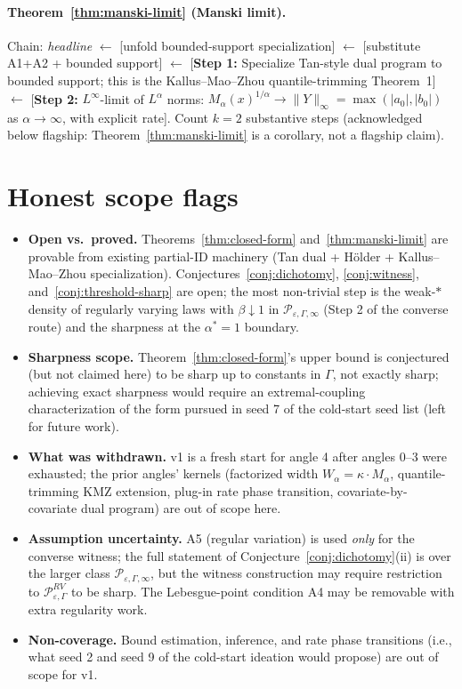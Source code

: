 \documentclass[11pt]{article}
\theoremstyle{definition}
\theoremstyle{plain}
\theoremstyle{remark}
\begin{document}
\paragraph{Theorem~\ref{thm:manski-limit} (Manski limit).}
Chain: \emph{headline} $\leftarrow$ [unfold bounded-support specialization] $\leftarrow$ [substitute A1+A2 + bounded support] $\leftarrow$ [\textbf{Step 1:} Specialize Tan-style dual program to bounded support; this is the Kallus--Mao--Zhou quantile-trimming Theorem~1] $\leftarrow$ [\textbf{Step 2:} $L^{\infty}$-limit of $L^{\alpha}$ norms: $M_{\alpha}(x)^{1/\alpha}\to\|Y\|_{\infty}=\max(|a_{0}|,|b_{0}|)$ as $\alpha\to\infty$, with explicit rate]. Count $k=2$ substantive steps (acknowledged below flagship: Theorem~\ref{thm:manski-limit} is a corollary, not a flagship claim).

\section{Honest scope flags}

\begin{itemize}[leftmargin=1.5em,itemsep=2pt]
\item \textbf{Open vs.\ proved.} Theorems~\ref{thm:closed-form} and~\ref{thm:manski-limit} are provable from existing partial-ID machinery (Tan dual + Hölder + Kallus--Mao--Zhou specialization). Conjectures~\ref{conj:dichotomy}, \ref{conj:witness}, and~\ref{conj:threshold-sharp} are open; the most non-trivial step is the weak-$*$ density of regularly varying laws with $\beta\downarrow 1$ in $\mathcal{P}_{\varepsilon,\Gamma,\infty}$ (Step 2 of the converse route) and the sharpness at the $\alpha^{*}=1$ boundary.
\item \textbf{Sharpness scope.} Theorem~\ref{thm:closed-form}'s upper bound is conjectured (but not claimed here) to be sharp up to constants in $\Gamma$, not exactly sharp; achieving exact sharpness would require an extremal-coupling characterization of the form pursued in seed 7 of the cold-start seed list (left for future work).
\item \textbf{What was withdrawn.} v1 is a fresh start for angle 4 after angles 0--3 were exhausted; the prior angles' kernels (factorized width $W_{\alpha}=\kappa\cdot M_{\alpha}$, quantile-trimming KMZ extension, plug-in rate phase transition, covariate-by-covariate dual program) are out of scope here.
\item \textbf{Assumption uncertainty.} A5 (regular variation) is used \emph{only} for the converse witness; the full statement of Conjecture~\ref{conj:dichotomy}(ii) is over the larger class $\mathcal{P}_{\varepsilon,\Gamma,\infty}$, but the witness construction may require restriction to $\mathcal{P}^{RV}_{\varepsilon,\Gamma}$ to be sharp. The Lebesgue-point condition A4 may be removable with extra regularity work.
\item \textbf{Non-coverage.} Bound estimation, inference, and rate phase transitions (i.e., what seed 2 and seed 9 of the cold-start ideation would propose) are out of scope for v1.
\end{itemize}
\end{document}
